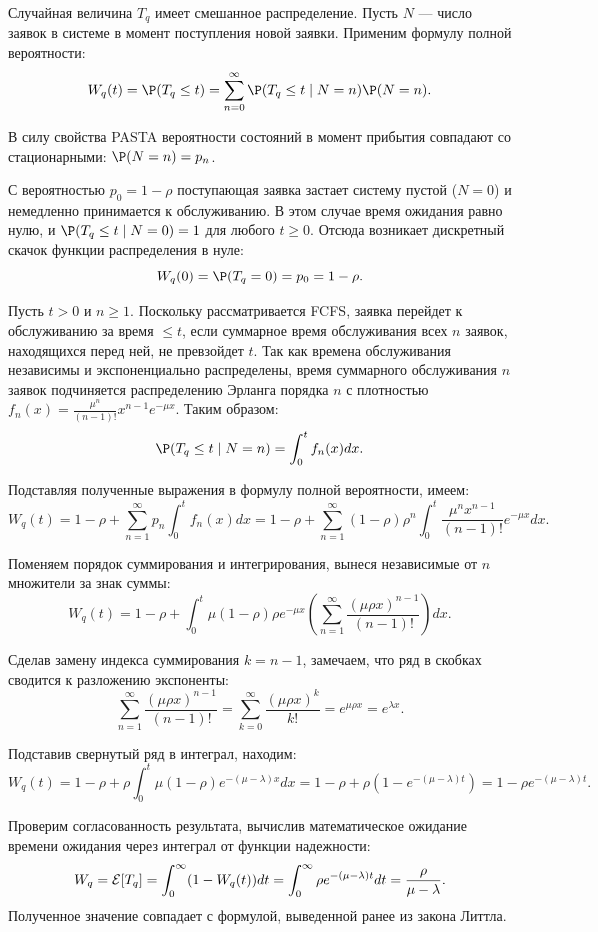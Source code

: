 \begin{sproof}
Случайная величина $T_q$ имеет смешанное распределение. Пусть $N$ — число заявок в системе в момент поступления новой заявки. Применим формулу полной вероятности:
$$
W_q(t) = \P(T_q \le t) = \sum_{n=0}^{\infty} \P(T_q \le t \mid N = n) \P(N = n).
$$

В силу свойства PASTA вероятности состояний в момент прибытия совпадают со стационарными: $\P(N = n) = p_n$.

С вероятностью $p_0 = 1 - \rho$ поступающая заявка застает систему пустой ($N = 0$) и немедленно принимается к обслуживанию. В этом случае время ожидания равно нулю, и $\P(T_q \le t \mid N = 0) = 1$ для любого $t \ge 0$. Отсюда возникает дискретный скачок функции распределения в нуле: 
$$
W_q(0) = \P(T_q = 0) = p_0 = 1 - \rho.
$$

Пусть $t > 0$ и $n \ge 1$. Поскольку рассматривается FCFS, заявка перейдет к обслуживанию за время $\le t$, если суммарное время обслуживания всех $n$ заявок, находящихся перед ней, не превзойдет $t$. Так как времена обслуживания независимы и экспоненциально распределены, время суммарного обслуживания $n$ заявок подчиняется распределению Эрланга порядка $n$ с плотностью $f_n(x) = \frac{\mu^n}{(n-1)!} x^{n-1} e^{-\mu x}$. Таким образом:
$$
\P(T_q \le t \mid N = n) = \int_0^t f_n(x) dx.
$$

Подставляя полученные выражения в формулу полной вероятности, имеем:
$$
W_q(t) = 1 - \rho + \sum_{n=1}^{\infty} p_n \int_0^t f_n(x) dx = 1 - \rho + \sum_{n=1}^{\infty} (1 - \rho)\rho^n \int_0^t \frac{\mu^n x^{n-1}}{(n-1)!} e^{-\mu x} dx.
$$

Поменяем порядок суммирования и интегрирования, вынеся независимые от $n$ множители за знак суммы:
$$
W_q(t) = 1 - \rho + \int_0^t \mu (1 - \rho) \rho e^{-\mu x} \left( \sum_{n=1}^{\infty} \frac{(\mu \rho x)^{n-1}}{(n-1)!} \right) dx.
$$

Сделав замену индекса суммирования $k = n - 1$, замечаем, что ряд в скобках сводится к разложению экспоненты:
$$
\sum_{n=1}^{\infty} \frac{(\mu \rho x)^{n-1}}{(n-1)!} = \sum_{k=0}^{\infty} \frac{(\mu \rho x)^k}{k!} = e^{\mu \rho x} = e^{\lambda x}.
$$

Подставив свернутый ряд в интеграл, находим:
$$
W_q(t) = 1 - \rho + \rho \int_0^t \mu (1 - \rho) e^{-(\mu - \lambda)x} dx = 1 - \rho + \rho \left( 1 - e^{-(\mu - \lambda)t} \right) = 1 - \rho e^{-(\mu - \lambda)t}.
$$

Проверим согласованность результата, вычислив математическое ожидание времени ожидания через интеграл от функции надежности:
$$
W_q = \mathcal{E}[T_q] = \int_0^{\infty} (1 - W_q(t)) dt = \int_0^{\infty} \rho e^{-(\mu - \lambda)t} dt = \frac{\rho}{\mu - \lambda}.
$$
Полученное значение совпадает с формулой, выведенной ранее из закона Литтла.


\end{sproof}
